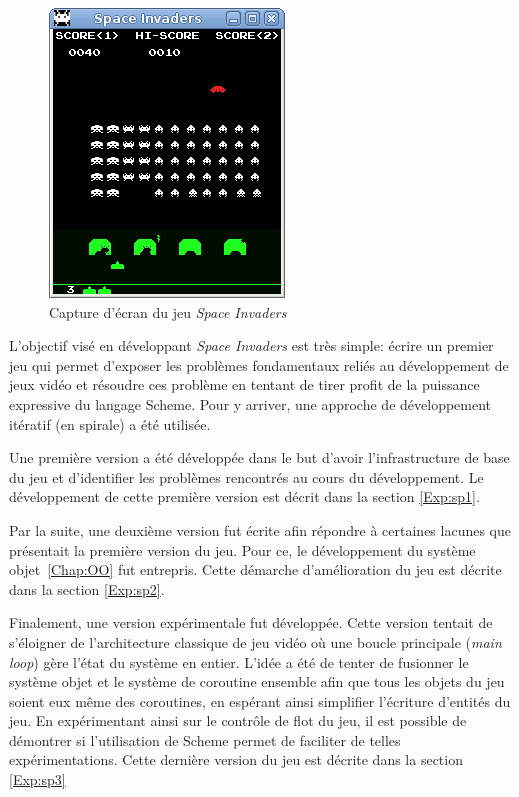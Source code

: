 \documentclass[12pt,oneside,letterpaper,francais]{book}
\newcommand{\si}{{\textit{Space Invaders }}}
\begin{document}
\begin{figure}[htb!]
  \center
  \includegraphics[scale=0.7]{space-invaders-screenshot}
  \caption{Capture d'écran du jeu \si}
  \label{Exp:si-screen}
\end{figure}

L'objectif visé en développant \si est très simple: écrire un premier
jeu qui permet d'exposer les problèmes fondamentaux reliés au
développement de jeux vidéo et résoudre ces problème en tentant de
tirer profit de la puissance expressive du langage Scheme. Pour y
arriver, une approche de développement itératif (en spirale) a été
utilisée.

Une première version a été développée dans le but d'avoir
l'infrastructure de base du jeu et d'identifier les problèmes
rencontrés au cours du développement. Le développement de cette
première version est décrit dans la section \ref{Exp:sp1}.

Par la suite, une deuxième version fut écrite afin répondre à
certaines lacunes que présentait la première version du jeu. Pour ce,
le développement du système objet~\ref{Chap:OO} fut entrepris. Cette
démarche d'amélioration du jeu est décrite dans la section
\ref{Exp:sp2}.

Finalement, une version expérimentale fut développée. Cette version
tentait de s'éloigner de l'architecture classique de jeu vidéo où une
boucle principale (\textit{main loop}) gère l'état du système en
entier. L'idée a été de tenter de fusionner le système objet et le
système de coroutine ensemble afin que tous les objets du jeu soient
eux même des coroutines, en espérant ainsi simplifier l'écriture
d'entités du jeu. En expérimentant ainsi sur le contrôle de flot du
jeu, il est possible de démontrer si l'utilisation de Scheme permet de
faciliter de telles expérimentations. Cette dernière version du jeu
est décrite dans la section \ref{Exp:sp3}
\end{document}
